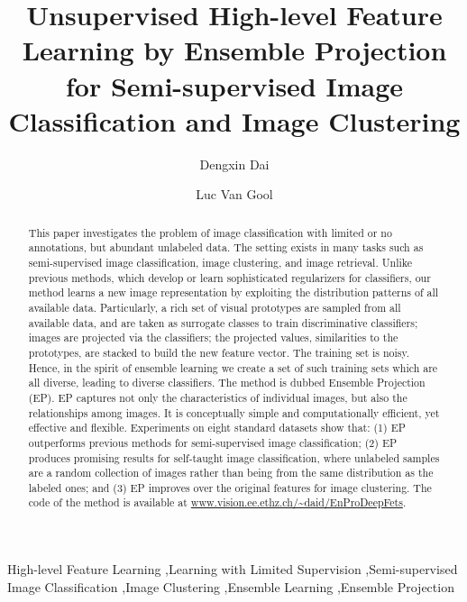 \documentclass[preprint,12pt,3p]{elsarticle}
\begin{document}
\begin{frontmatter}

\title{Unsupervised High-level Feature Learning by Ensemble Projection for Semi-supervised Image Classification and Image Clustering
 }


\author{Dengxin Dai}

\author{Luc Van Gool}

\address{Computer Vision Lab, ETH Z\"urich, CH-8092, Switzerland}

\begin{abstract}
 This paper investigates the problem of image classification with limited or no annotations, but
 abundant unlabeled data. 
The setting exists in many tasks such as semi-supervised image classification, image clustering, and image retrieval.
Unlike previous methods, which develop or learn sophisticated regularizers for classifiers, our method learns a new
  image representation 
  by exploiting the distribution patterns of all available data. Particularly, a rich set of visual prototypes are sampled
  from all available data, and are taken as surrogate classes to train
  discriminative classifiers; images are projected  via
  the classifiers; the projected values, similarities to the
  prototypes, are stacked to build the new feature vector. The training
  set is noisy. Hence, in the spirit of ensemble learning we
  create a set of such training sets which are all diverse, leading to
 diverse classifiers. The method is dubbed Ensemble
  Projection (EP).  EP captures not only the characteristics of
  individual images, but also the relationships among images. It is
  conceptually simple and computationally efficient, yet effective and
  flexible.  Experiments on eight standard datasets show that: (1) EP
  outperforms previous methods for semi-supervised image
  classification; (2) EP produces promising results for self-taught
  image classification, where unlabeled samples are a random
  collection of images rather than being from the same distribution as
 the labeled ones; and (3) EP improves over the original features for
  image clustering. The code of the method is available at
  \url{www.vision.ee.ethz.ch/~daid/EnProDeepFets}.
\end{abstract}

\begin{keyword}
 High-level Feature Learning \sep Learning with Limited Supervision \sep Semi-supervised Image Classification \sep Image Clustering
     \sep Ensemble Learning \sep Ensemble Projection
\end{keyword}

\end{frontmatter}
\end{document}
